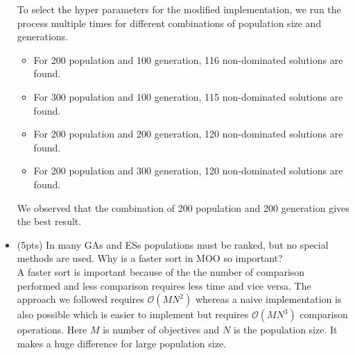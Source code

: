 \documentclass{article}
\begin{document}
\begin{itemize}
{	To select the hyper parameters for the modified implementation, we run the process multiple times for different combinations of population size and generations.
	\begin{itemize}
		\item For 200 population and 100 generation, 116 non-dominated solutions are found.
		\item For 300 population and 100 generation, 115 non-dominated solutions are found.
		\item For 200 population and 200 generation, 120 non-dominated solutions are found.
		\item For 200 population and 300 generation, 120 non-dominated solutions are found.
	\end{itemize}
	We observed that the combination of 200 population and 200 generation gives the best result.
	}
	\item (5pts) In many GAs and ESs populations must be ranked, but no special methods are used. Why is a faster sort in MOO so important?\\
	{\color{blue}A faster sort is important because of the the number of comparison performed and less comparison requires less time and vice versa. The approach we followed requires $\mathcal{O}(M N^2)$ whereas a naive implementation is also possible which is easier to implement but requires $\mathcal{O}(M N^3)$ comparison operations. Here $M$ is number of objectives and $N$ is the population size. It makes a huge difference for large population size.}
\end{itemize}

\newpage
\end{document}
